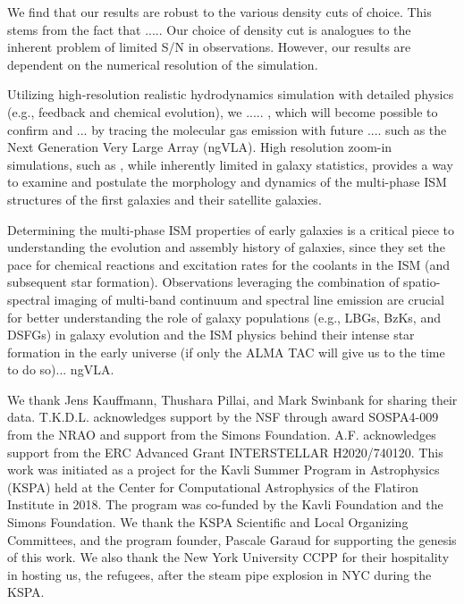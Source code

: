 \documentclass[iop]{emulateapj} %
\begin{document}
We find that our results are robust to the various density cuts of choice.
This stems from the
fact that ..... Our choice of density cut is analogues to the inherent problem of limited S/N
in observations.
However, our results are dependent on the numerical resolution of the simulation.

Utilizing high-resolution realistic hydrodynamics simulation with
detailed physics (e.g., feedback and chemical evolution), we
..... , which will become possible to confirm and ... by tracing
the molecular gas emission with future .... such as the Next Generation Very Large Array (ngVLA).
High resolution zoom-in simulations, such as , while inherently limited in galaxy
statistics, provides a way to examine and postulate the morphology and dynamics of
the multi-phase ISM structures of the first galaxies and their satellite galaxies.

Determining the multi-phase ISM properties of early galaxies
is a critical piece to understanding the evolution and
assembly history of galaxies, since they set the pace
for chemical reactions and excitation rates for the coolants in the ISM (and subsequent star formation).
Observations leveraging the combination of spatio-spectral imaging of
multi-band continuum and spectral line emission are crucial for better understanding
the role of \highz galaxy populations
(e.g., LBGs, BzKs, and DSFGs) in
galaxy evolution and the ISM physics behind their intense star formation in the early universe
(if only the ALMA TAC will give us to the time to do so)...
ngVLA.


\acknowledgements

We thank Jens Kauffmann, Thushara Pillai, and Mark Swinbank for sharing their data.
T.K.D.L. acknowledges support by the NSF through award SOSPA4-009
from the NRAO and support from the Simons Foundation.
A.F. acknowledges support from the ERC Advanced Grant INTERSTELLAR H2020/740120.
This work was initiated as a project for the Kavli Summer Program in Astrophysics (KSPA)
held at the Center for
Computational Astrophysics of the Flatiron Institute in 2018. The program was co-funded by the Kavli
Foundation and the Simons Foundation.
We thank the KSPA Scientific and Local Organizing Committees, and the program founder,
Pascale Garaud for supporting the genesis of this work.
We also thank the New York University CCPP for their hospitality in hosting us, the refugees, after the steam pipe explosion in NYC during the KSPA.
\end{document}
